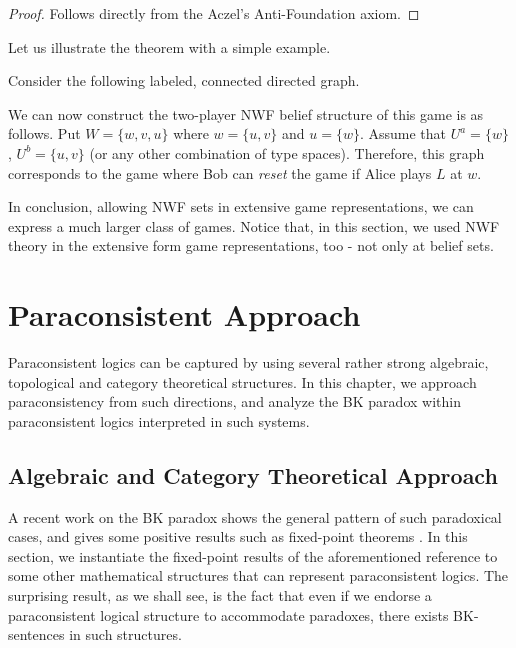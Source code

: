 \documentclass{article}
\begin{document}
\begin{proof}
Follows directly from the Aczel's Anti-Foundation axiom.
\end{proof}

Let us illustrate the theorem with a simple example.

\begin{ex}{\label{nwf-example}}
Consider the following labeled, connected directed graph.
\begin{center}\end{center}
We can now construct the two-player NWF belief structure of this game is as follows. Put $W = \{ w, v, u \}$ where $w = \{ u, v \}$ and $u = \{ w \}$. Assume that $U^a =\{w \}$, $U^b = \{ u, v\}$ (or any other combination of type spaces). Therefore, this graph corresponds to the game where Bob can \emph{reset} the game if Alice plays $L$ at $w$.
\end{ex}

In conclusion, allowing NWF sets in extensive game representations, we can express a much larger class of games. Notice that, in this section, we used NWF theory in the extensive form game representations, too - not only at belief sets.


\section{Paraconsistent Approach}

Paraconsistent logics can be captured by using several rather strong algebraic, topological and category theoretical structures. In this chapter, we  approach paraconsistency from such directions, and analyze the BK paradox within paraconsistent logics interpreted in such systems.


\subsection{Algebraic and Category Theoretical Approach}

A recent work on the BK paradox shows the general pattern of such paradoxical cases, and gives some positive results such as fixed-point theorems \cite{abr0}. In this section, we instantiate the fixed-point results of the aforementioned reference to some other mathematical structures that can represent paraconsistent logics. The surprising result, as we shall see, is the fact that even if we endorse a paraconsistent logical structure to accommodate paradoxes, there exists BK-sentences in such structures.
\end{document}
